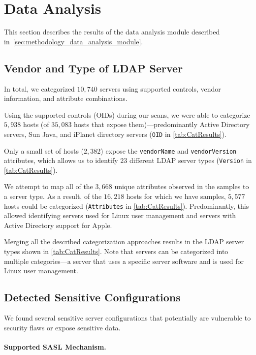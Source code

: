 \section{Data Analysis}
This section describes the results of the data analysis module described in~\cref{sec:methodology_data_analysis_module}.
\label{sec:data_analysis_results}

\subsection{Vendor and Type of LDAP Server}
In total, we categorized $10,740$ servers using supported controls, vendor information, and attribute combinations.

Using the supported controls (\glspl{OID}) during our scans, we were able to categorize $5,938$ hosts (of $35,083$ hosts that expose them)---predominantly Active Directory servers, Sun Java, and iPlanet directory servers (\texttt{OID} in \cref{tab:CatResults}).

Only a small set of hosts ($2,382$) expose the \texttt{vendorName} and \texttt{vendorVersion} attributes, which allows us to identify $23$ different LDAP server types (\texttt{Version} in \cref{tab:CatResults}).

We attempt to map all of the $3,668$ unique attributes observed in the samples to a server type. As a result, of the $16,218$ hosts for which we have samples, $5,577$ hosts could be categorized (\texttt{Attributes} in \cref{tab:CatResults}). Predominantly, this allowed identifying servers used for Linux user management and servers with Active Directory support for Apple.

Merging all the described categorization approaches results in the LDAP server types shown in \cref{tab:CatResults}. Note that servers can be categorized into multiple categories---\eg a server that uses a specific server software and is used for Linux user management.

%

\subsection{Detected Sensitive Configurations}
We found several sensitive server configurations that potentially are vulnerable to security flaws or expose sensitive data.


\paragraph{Supported SASL Mechanism.}

